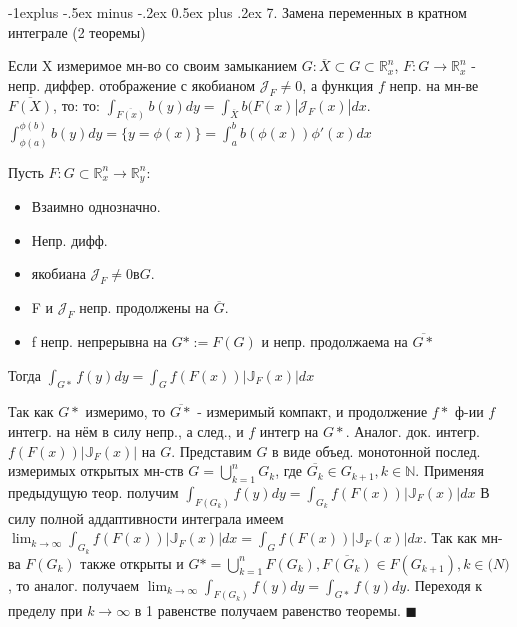 \documentclass[unicode,10pt, landscape]{article}
\makeatletter
\renewcommand{\subsection}{\@startsection{subsection}{2}{0mm}%
                                {-1explus -.5ex minus -.2ex}%
                                {0.5ex plus .2ex}%
                                {\normalfont\normalsize\bfseries}}
\newenvironment{Proof} %
{\par\noindent{\bf Док-во:}} %
{\hfill$\scriptstyle\blacksquare$}
\makeatother
\begin{document}
\begin{multicols}{4}
 \subsection{7. Замена переменных в кратном интеграле (2 теоремы)}
 \begin{Th}
  Если X измеримое мн-во со своим замыканием $G: \overline{X} \subset G \subset \mathbb{R}^n_x$, $F: G \to \mathbb{R}^n_x$ - непр. диффер. отображение с якобианом $\mathcal{J}_F \neq 0$, а функция $f$ непр. на мн-ве $\overline{F(X)}$, то:
  то: $\int_{\overline{F(x)}}b(y)dy = \int_{\overline{X}}b(F(x)|\mathcal{J}_F (x)| dx$.
  $\int_{\phi(a)}^{\phi(b)}b(y)dy = \{ y = \phi(x) \} = \int_a^b b(\phi(x)) \phi'(x) dx$
 \end{Th}
 \begin{Th}
  Пусть $F: G \subset \mathbb{R}^n_x \to \mathbb{R}^n_y$:
  \begin{itemize}
   \item Взаимно однозначно.
   \item Непр. дифф.
   \item якобиана $\mathcal{J}_F \neq 0 в G$.
   \item F и $\mathcal{J}_F$ непр. продолжены на $\overline{G}$.
   \item f непр. непрерывна на $G* := F(G)$ и непр. продолжаема на $\overline{G*}$
  \end{itemize}
  Тогда $\int_{G*}f(y)dy = \int_{G}f(F(x))|\mathbb{J}_F(x)|dx$
 \end{Th}
 \begin{Proof}
  Так как $G*$ измеримо, то $\overline{G*}$ - измеримый компакт, и продолжение $f*$ ф-ии $f$ интегр. на нём в силу непр., а след., и $f$ интегр на $G*$. Аналог. док. интегр. $f(F(x))|\mathbb{J}_F(x)|$ на $G$.
  Представим $G$ в виде объед. монотонной послед. измеримых открытых мн-ств $G = \bigcup_{k=1}^{n} G_k$, где $\overline{G_k} \in G_{k+1}, k \in \mathbb{N}$. Применяя предыдущую теор. получим $\int_{F(G_k)}f(y)dy = \int_{G_k}f(F(x))|\mathbb{J}_F(x)|dx$
  В силу полной аддаптивности интеграла имеем $\lim_{k \to \infty} \int_{G_k}f(F(x))|\mathbb{J}_F(x)|dx = \int_{G}f(F(x))|\mathbb{J}_F(x)|dx$.
  Так как мн-ва $F(G_k)$ также открыты и $G* = \bigcup_{k=1}^{n} F(G_k), \overline{F(G_k)} \in F(G_{k+1}), k \in \mathbb(N)$, то аналог. получаем $\lim_{k\to\infty} \int_{F(G_k)} f(y)dy = \int_{G*} f(y)dy$.
  Переходя к пределу при $k\to\infty$ в 1 равенстве получаем равенство теоремы.
 \end{Proof}

\end{multicols}
\end{document}
